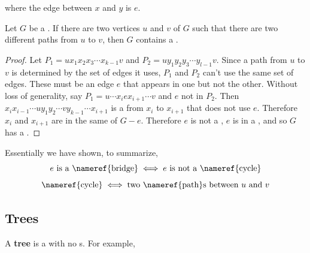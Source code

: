 \documentclass[english, 11pt]{article}
\begin{document}
  \begin{center}
\end{center}

where the edge between $x$ and $y$ is $e$.

\begin{thrm}
  Let $G$ be a . If there are two vertices $u$ and $v$ of $G$ such that there are two different paths from $u$ to $v$, then $G$ contains a .
\end{thrm}
\begin{proof}
  Let $P_1 = ux_1x_2x_3\cdots x_{k-1}v$ and $P_2 = uy_1y_2y_3\cdots y_{l-1} v$. Since a path from $u$ to $v$ is determined by the set of edges it uses, $P_1$ and $P_2$ can't use the same set of edges. These must be an edge $e$ that appears in one but not the other. Without loss of generality, say $P_1 = u \cdots x_i e x_{i+1}\cdots v$ and $e$ not in $P_2$. Then $x_ix_{i-1}\cdots u y_1 y_2 \cdots v y_{k-1} \cdots x_{i+1}$ is a  from $x_i$ to $x_{i+1}$ that does not use $e$. Therefore $x_i$ and $x_{i+1}$ are in the same  of $G - e$. Therefore $e$ is not a , $e$ is in a , and so $G$ has a .
\end{proof}
Essentially we have shown, to summarize,
\[ \mbox{$e$ is a \nameref{bridge}} \iff \mbox{$e$ is not a \nameref{cycle}} \]
\[ \mbox{\nameref{cycle}} \iff \mbox{two \nameref{path}s between $u$ and $v$} \]
\subsection{Trees}

\begin{defn}[tree]\label{tree}
A \textbf{tree} is a   with no s. For example,
  \begin{center}
\end{center}
\end{defn}
\end{document}
